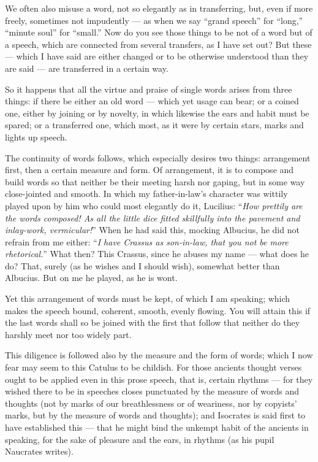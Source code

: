  We often also misuse a word, not so elegantly as in transferring, but, even if more freely, sometimes not impudently — as when we say ``grand speech'' for ``long,'' ``minute soul'' for ``small.'' Now do you see those things to be not of a word but of a speech, which are connected from several transfers, as I have set out? But these — which I have said are either changed or to be otherwise understood than they are said — are transferred in a certain way.

 So it happens that all the virtue and praise of single words arises from three things: if there be either an old word — which yet usage can bear; or a coined one, either by joining or by novelty, in which likewise the ears and habit must be spared; or a transferred one, which most, as it were by certain stars, marks and lights up speech.

 The continuity of words follows, which especially desires two things: arrangement first, then a certain measure and form. Of arrangement, it is to compose and build words so that neither be their meeting harsh nor gaping, but in some way close-jointed and smooth. In which my father-in-law's character was wittily played upon by him who could most elegantly do it, Lucilius: ``\textit{How prettily are the words composed! As all the little dice fitted skillfully into the pavement and inlay-work, vermicular!}'' When he had said this, mocking Albucius, he did not refrain from me either: ``\textit{I have Crassus as son-in-law, that you not be more rhetorical.}'' What then? This Crassus, since he abuses my name — what does he do? That, surely (as he wishes and I should wish), somewhat better than Albucius. But on me he played, as he is wont.

 Yet this arrangement of words must be kept, of which I am speaking; which makes the speech bound, coherent, smooth, evenly flowing. You will attain this if the last words shall so be joined with the first that follow that neither do they harshly meet nor too widely part.

 This diligence is followed also by the measure and the form of words; which I now fear may seem to this Catulus to be childish. For those ancients thought verses ought to be applied even in this prose speech, that is, certain rhythms — for they wished there to be in speeches closes punctuated by the measure of words and thoughts (not by marks of our breathlessness or of weariness, nor by copyists' marks, but by the measure of words and thoughts); and Isocrates is said first to have established this — that he might bind the unkempt habit of the ancients in speaking, for the sake of pleasure and the ears, in rhythms (as his pupil Naucrates writes).

